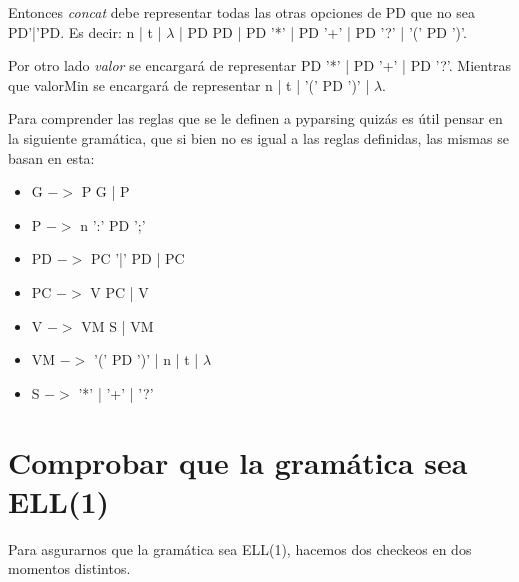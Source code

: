 \documentclass[a4paper]{report}
\begin{document}
Entonces \emph{concat} debe representar todas las otras opciones de PD que no sea PD'|'PD. Es decir: n | t | $\lambda$ | PD PD | PD '*' | PD '+' | PD '?' | '(' PD ')'.

Por otro lado \emph{valor} se encargará de representar PD '*' | PD '+' | PD '?'. Mientras que valorMin se encargará de representar n | t | '(' PD ')' | $\lambda$.

Para comprender las reglas que se le definen a pyparsing quizás es útil pensar en la siguiente gramática, que si bien no es igual a las reglas definidas, las mismas se basan en esta:
\begin{itemize}
\item G $->$ P G | P
\item P $->$ n ':' PD ';'
\item PD $->$  PC '|' PD | PC
\item PC $->$ V PC | V
\item V $->$ VM S | VM
\item VM $->$ '(' PD ')' | n | t | $\lambda$
\item S $->$ '*' | '+' | '?'
\end{itemize}


%
%
%
%
%
%
%


\section*{Comprobar que la gramática sea ELL(1)}

Para asgurarnos que la gramática sea ELL(1), hacemos dos checkeos en dos
momentos distintos.
\end{document}
